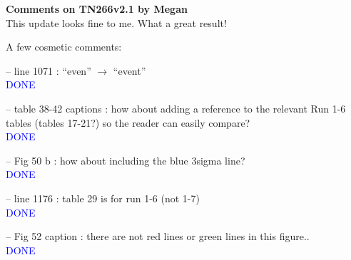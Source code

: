 \documentclass[final]{elsarticle}
\begin{document}
{\Large \textbf{Comments on TN266v2.1 by Megan}} \\

This update looks fine to me.  What a great result! 

A few cosmetic comments:

-- line 1071 : ``even'' $\rightarrow$ ``event'' \\ 
\textcolor{blue}{DONE}

-- table 38-42 captions : how about adding a reference to the relevant Run 1-6
tables (tables 17-21?) so the reader can easily compare? \\
\textcolor{blue}{DONE}

-- Fig 50 b : how about including the blue 3sigma line? \\
\textcolor{blue}{DONE}

-- line 1176 : table 29 is for run 1-6 (not 1-7) \\
\textcolor{blue}{DONE}

-- Fig 52 caption : there are not red lines or green lines in this figure.. \\
\textcolor{blue}{DONE}
\end{document}
